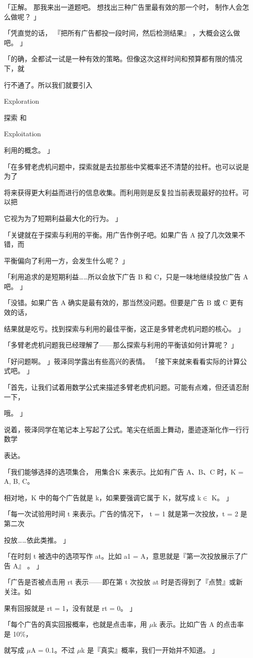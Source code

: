 「正解。 那我来出一道题吧。 想找出三种广告里最有效的那一个时， 制作人会怎么做呢？ 」\par
「凭直觉的话， 『把所有广告都投一段时间，然后检测结果』 ，大概会这么做吧。 」\par
「的确，全都试一试是一种有效的策略。但像这次这样时间和预算都有限的情况下，就\par
行不通了。所以我们就要引入\par
Exploration\par
探索 和\par
Exploitation\par
利用的概念。 」\par
「在多臂老虎机问题中，探索就是去拉那些中奖概率还不清楚的拉杆。也可以说是为了\par
将来获得更大利益而进行的信息收集。而利用则是反复拉当前表现最好的拉杆。可以把\par
它视为为了短期利益最大化的行为。 」\par
「关键就在于探索与利用的平衡。用广告作例子吧。如果广告 A 投了几次效果不错，而\par
平衡偏向了利用一方，会发生什么呢？ 」\par
「利用追求的是短期利益……所以会放下广告 B 和 C，只是一味地继续投放广告 A 吧。 」\par
「没错。如果广告 A 确实是最有效的，那当然没问题。但要是广告 B 或 C 更有效的话，\par
结果就是吃亏。找到探索与利用的最佳平衡，这正是多臂老虎机问题的核心。 」\par
「多臂老虎机问题我已经理解了——那么探索与利用的平衡该如何计算呢？ 」\par
「好问题啊。 」筱泽同学露出有些高兴的表情。 「接下来就来看看实际的计算公式吧。 」\par
「首先，让我们试着用数学公式来描述多臂老虎机问题。可能有点难，但还请忍耐一下，\par
哦。 」\par
说着，筱泽同学在笔记本上写起了公式。笔尖在纸面上舞动，墨迹逐渐化作一行行数学\par
表达。\par
「我们能够选择的选项集合， 用集合K 来表示。比如有广告 A、B、C 时，K = A, B, C。\par
相对地，K 中的每个广告就是 k，如果要强调它属于 K，就写成 k$\in$ K。 」\par
「每一次试验用时间 t 来表示。广告的情况下， t = 1 就是第一次投放，t = 2 是第二次\par
投放……依此类推。 」\par
「在时刻 t 被选中的选项写作 at。比如 a1 = A，意思就是『第一次投放展示了广告 A』 。 」\par
「广告是否被点击用 rt 表示——即在第 t 次投放 at 时是否得到了『点赞』或新关注。如\par
果有回报就是 rt = 1，没有就是 rt = 0。 」\par
「每个广告的真实回报概率，也就是点击率，用 $\mu$k 表示。比如广告 A 的点击率是 10\%，\par
就写成 $\mu$A = 0.1。不过 $\mu$k 是『真实』概率，我们一开始并不知道。 」\par

